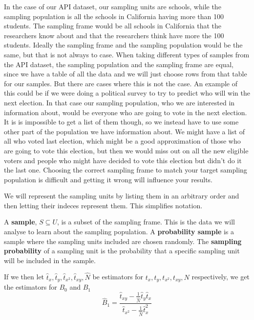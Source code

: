 \documentclass{article}
\begin{document}
In the case of our API dataset, our sampling units are schools, while
the sampling population is all the schools in California having more than 100 students.
The sampling frame would be all schools in California that the researchers know
about and that the researchers think have more the 100 students.
Ideally the sampling frame and the sampling population would be the same, but that is not always to case.
When taking different types of samples from the API dataset, the sampling population and the sampling frame are equal, since
we have a table of all the data and we will just choose rows from that table for
our samples. But there are cases where this is not the case. An example of this
could be if we were doing a political survey to try to predict who will win the
next election.
In that case our sampling population, who we are interested in information
about, would be everyone who are going to vote in the next election. It is
is impossible to get a list of them though, so we instead have to use 
some other part of the population we have information about. We might have a
list of all who voted last election, which might be a good approximation of
those who are going to vote this election, but then we would miss out on all the
new eligible voters and people who might have decided to vote this election but
didn't do it the last one.
Choosing the correct sampling frame to match your target sampling population is
difficult and getting it wrong will influence your results.

We will represent the sampling units by listing them in an arbitrary order and
then letting their indeces represent them. This simplifies notation.


\begin{definition} \label{def:sample}
A \textbf{sample}, \(S \subseteq U\), is a subset of the sampling frame. This is the data we will analyse to learn about the sampling population.
A \textbf{probability sample} is a sample where the sampling units included are chosen randomly.
The \textbf{sampling probability} of a sampling unit is the probability that a
specific sampling unit will be included in the sample.
\end{definition}


If we then let \(\hat{t}_x, \hat{t}_y, \hat{t}_{x^2}, \hat{t}_{xy}, \hat{N}\) be estimators
for \(t_x, t_y, t_{x^2},
t_{xy}, N\) respectively, we get the estimators for \(B_0\) and \(B_1\)
\begin{equation*}
 \hat{B}_1 = \frac{\hat{t}_{xy} - \frac{1}{\widehat{N}} \hat{t}_y \hat{t}_x}
   {\hat{t}_{x^2} - \frac{1}{\widehat{N}} \hat{t}_x^2}
\end{equation*}
\end{document}
